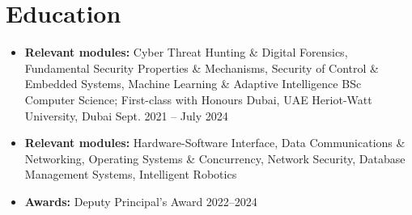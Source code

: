 \section{Education}
\begin{itemize}[leftmargin=*]
  \educationSubheading
    {MSc Cybersecurity and Artificial Intelligence; Distinction}
    {Sheffield, UK}
    {University of Sheffield}
    {Sept. 2024 -- Nov. 2025}
  \itemizeBegin
    \item \textbf{Relevant modules:} 
      Cyber Threat Hunting \& Digital Forensics, 
      Fundamental Security Properties \& Mechanisms, 
      Security of Control \& Embedded Systems, 
      Machine Learning \& Adaptive Intelligence
  \itemizeEnd \vspace{-0.6em}
  \educationSubheading
    {BSc Computer Science; First-class with Honours}
    {Dubai, UAE}
    {Heriot-Watt University, Dubai}
    {Sept. 2021 -- July 2024}
  \itemizeBegin
    \item \textbf{Relevant modules:} 
      Hardware-Software Interface, 
      Data Communications \& Networking, 
      Operating Systems \& Concurrency, 
      Network Security, 
      Database Management Systems,
      Intelligent Robotics \\
    \item \textbf{Awards:} Deputy Principal's Award 2022--2024
  \itemizeEnd
\end{itemize}
